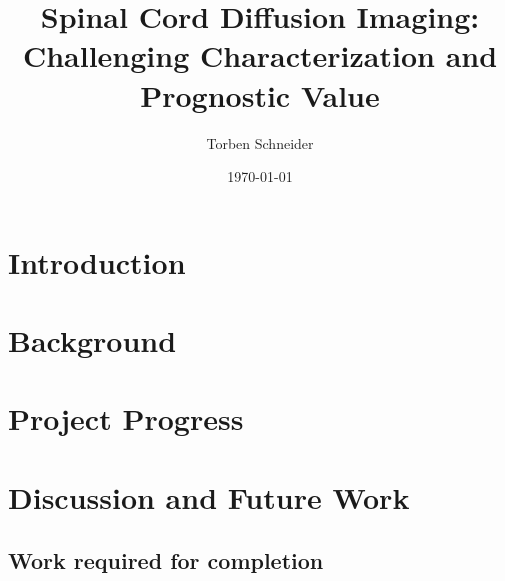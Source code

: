 \documentclass[a4paper]{scrreprt}
\begin{document}
 
\title{Spinal Cord Diffusion Imaging: Challenging Characterization and Prognostic Value} 
\date{\today} 
\author{Torben Schneider} 
\maketitle 
\chapter{Introduction}

\chapter{Background} 
 
\chapter{Project Progress}
 

\chapter{Discussion and Future Work}
	\section{Work required for completion}
\end{document}
